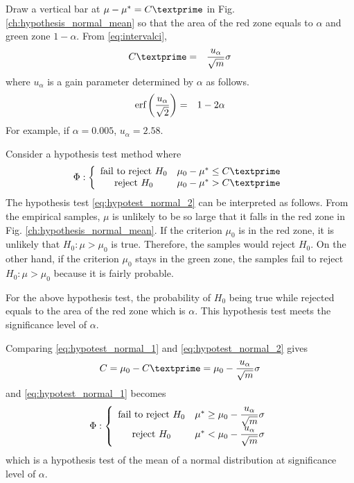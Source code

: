 Draw a vertical bar at $\mu-\mu^*=C\textprime$ in Fig. \ref{ch:hypothesis_normal_mean} so that the area of the red zone equals to $\alpha$ and green zone $1-\alpha$. From \eqref{eq:intervalci},
\begin{eqnarray}
	C\textprime &=& \dfrac{u_\alpha}{\sqrt{m}}\sigma \nonumber
\end{eqnarray}
where $u_\alpha$ is a gain parameter determined by $\alpha$ as follows.
\begin{eqnarray}
	\textup{erf}\left(\dfrac{u_\alpha}{\sqrt{2}}\right) &=& 1-2\alpha \nonumber
\end{eqnarray}
For example, if $\alpha = 0.005$, $u_\alpha=2.58$. 

Consider a hypothesis test method where
\begin{eqnarray}
	\Phi : \left\{\begin{array}{cc}
		\textup{fail to reject~} H_0 & \mu_0 - \mu^* \leq C\textprime \\
		\textup{reject~} H_0 & \mu_0 - \mu^* > C\textprime
	\end{array}\right. \label{eq:hypotest_normal_2}
\end{eqnarray}
The hypothesis test \eqref{eq:hypotest_normal_2} can be interpreted as follows. From the empirical samples, $\mu$ is unlikely to be so large that it falls in the red zone in Fig. \ref{ch:hypothesis_normal_mean}. If the criterion $\mu_0$ is in the red zone, it is unlikely that $H_0: \mu > \mu_0$ is true. Therefore, the samples would reject $H_0$. On the other hand, if the criterion $\mu_0$ stays in the green zone, the samples fail to reject $H_0: \mu > \mu_0$ because it is fairly probable. 

For the above hypothesis test, the probability of $H_0$ being true while rejected equals to the area of the red zone which is $\alpha$. This hypothesis test meets the significance level of $\alpha$. 

Comparing \eqref{eq:hypotest_normal_1} and \eqref{eq:hypotest_normal_2} gives
\begin{eqnarray}
	C = \mu_0 - C\textprime = \mu_0 - \dfrac{u_\alpha}{\sqrt{m}}\sigma \nonumber
\end{eqnarray}
and \eqref{eq:hypotest_normal_1} becomes
\begin{eqnarray}
	\Phi : \left\{\begin{array}{cc}
		\textup{fail to reject~} H_0 & \mu^* \geq \mu_0 - \dfrac{u_\alpha}{\sqrt{m}}\sigma \\
		\textup{reject~} H_0 & \mu^* < \mu_0 - \dfrac{u_\alpha}{\sqrt{m}}\sigma
	\end{array}\right. \nonumber
\end{eqnarray}
which is a hypothesis test of the mean of a normal distribution at significance level of $\alpha$.

